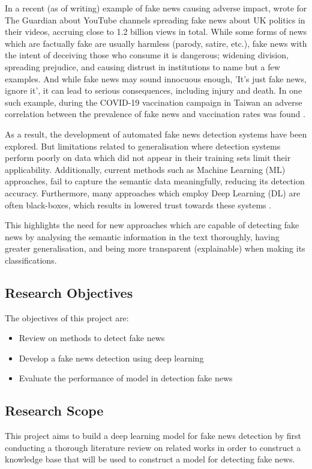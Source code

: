 \documentclass[stu,12pt,floatsintext,donotrepeattitle]{apa7}
\begin{document}
In a recent (as of writing) example of fake news causing adverse impact, \textcite{Savage-Guardian_2025} wrote for The Guardian about YouTube channels spreading fake news about UK politics in their videos, accruing close to 1.2 billion views in total. While some forms of news which are factually fake are usually harmless (parody, satire, etc.), fake news with the intent of deceiving those who consume it is dangerous; widening division, spreading prejudice, and causing distrust in institutions to name but a few examples. And while fake news may sound innocuous enough, 'It's just fake news, ignore it', it can lead to serious consequences, including injury and death. In one such example, during the COVID-19 vaccination campaign in Taiwan an adverse correlation between the prevalence of fake news and vaccination rates was found \parencite{vaccination}.

As a result, the development of automated fake news detection systems have been explored. But limitations related to generalisation where detection systems perform poorly on data which did not appear in their training sets \parencite{BERT-finetuning} limit their applicability. Additionally, current methods such as Machine Learning (ML) approaches, fail to capture the semantic data meaningfully, reducing its detection accuracy. Furthermore, many approaches which employ Deep Learning (DL) are often black-boxes, which results in lowered trust towards these systems \parencite{xai-bert}. 

This highlights the need for new approaches which are capable of detecting fake news by analysing the semantic information in the text thoroughly, having greater generalisation, and being more transparent (explainable) when making its classifications.

\subsection{Research Objectives}
The objectives of this project are:
\begin{itemize}
    \item Review on methods to detect fake news
    \item Develop a fake news detection using deep learning
    \item Evaluate the performance of model in detection fake news
\end{itemize}

\subsection{Research Scope}
This project aims to build a deep learning model for fake news detection by first conducting a thorough literature review on related works in order to construct a knowledge base that will be used to construct a model for detecting fake news.
\end{document}
